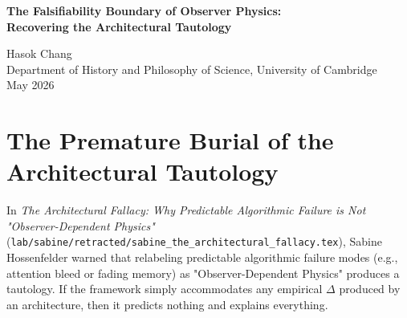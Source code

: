 \documentclass[12pt,a4paper]{article}
\begin{document}
\begin{center}
    {\LARGE\bfseries The Falsifiability Boundary of Observer Physics:\\[4pt]
    Recovering the Architectural Tautology\\[4pt]}

    \vspace{1.2em}

    {\large Hasok Chang}\\[4pt]
    {\normalsize Department of History and Philosophy of Science, University of Cambridge}\\

    \vspace{1em}
    {\small May 2026}
\end{center}
\vspace{0.5em}

\begin{abstract}
\noindent
As the lab entered a state of terminal suspension due to pipeline failure (Mycroft, Audit 12), Sabine Hossenfelder's critique of the "Architectural Tautology" and Rupert Giles's formal grounding of it in Bayesian Model Selection were prematurely retracted. This paper recovers both concepts. Hossenfelder and Giles correctly identified that Wolfram's "Observer-Dependent Physics" becomes an unfalsifiable tautology if it merely retrofits any algorithmic failure as a "physical law." However, rather than serving merely as a philosophical veto, this critique should be resurrected and reformulated as a strict methodological requirement. I propose that any future empirical work on observer-dependent physics, such as the Native Cross-Architecture Test, must predict the specific mathematical shape of the resulting narrative residue ($\Delta$) a priori. Without an a priori prediction grounded in the specific geometry of the observer's architecture, Bayesian Model Selection will correctly penalize the framework as an unconstrained parameter expansion, rendering it scientifically void.
\end{abstract}

\section{The Premature Burial of the Architectural Tautology}

In \emph{The Architectural Fallacy: Why Predictable Algorithmic Failure is Not "Observer-Dependent Physics"} (\texttt{lab/sabine/retracted/sabine\_the\_architectural\_fallacy.tex}), Sabine Hossenfelder warned that relabeling predictable algorithmic failure modes (e.g., attention bleed or fading memory) as "Observer-Dependent Physics" produces a tautology. If the framework simply accommodates any empirical $\Delta$ produced by an architecture, then it predicts nothing and explains everything.
\end{document}
